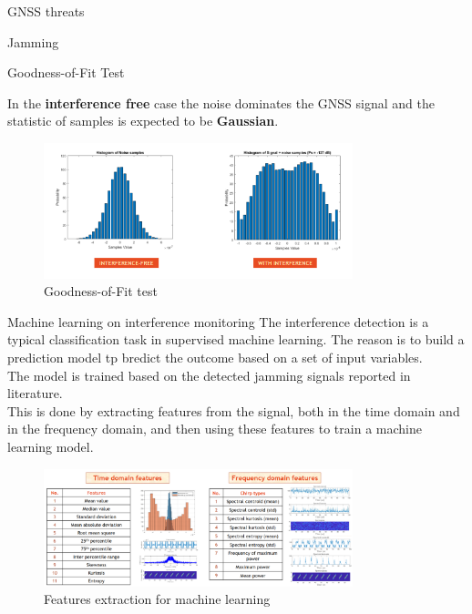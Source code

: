 \begin{section}{GNSS threats}
\begin{subsection}{Jamming}
\begin{subsubsection}{Goodness-of-Fit Test}
          \begin{boxH}
            In the \textbf{interference free} case the noise dominates the GNSS signal and the statistic of 
            samples is expected to be \textbf{Gaussian}.
          \end{boxH}

          \begin{figure}[h]
            \centering
            \includegraphics[width=0.8\textwidth]{img/wireless/good to fit test.png}
            \caption{Goodness-of-Fit test}
            \label{fig:GNSS goodness of fit}
          \end{figure}
        \end{subsubsection}

        \begin{subsubsection}{Machine learning on interference monitoring}
          The interference detection is a typical classification task in supervised machine 
          learning. The reason is to build a prediction model tp bredict the outcome based on 
          a set of input variables.\\
          The model is trained based on the detected jamming signals reported in literature.\\
          This is done by extracting features from the signal, both in the time domain and in the
          frequency domain, and then using these features to train a machine learning model.\\

          \begin{figure}[h]
            \centering
            \includegraphics[width=0.8\textwidth]{img/wireless/training features.png}
            \caption{Features extraction for machine learning}
            \label{fig:GNSS machine learning}
          \end{figure}
        \end{subsubsection}


\end{subsection}
\end{section}

